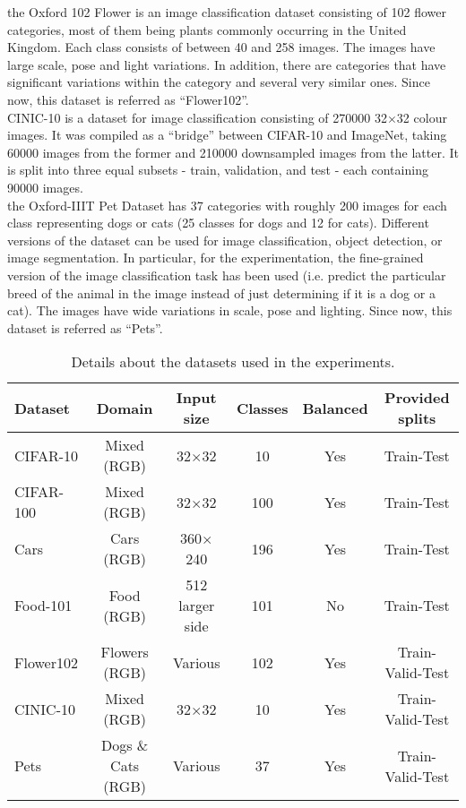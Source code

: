 \documentclass[review]{elsarticle}
\begin{document}
 the Oxford 102 Flower is an image classification dataset consisting of 102 flower categories, most of them being plants commonly occurring in the United Kingdom. Each class consists of between 40 and 258 images. The images have large scale, pose and light variations. In addition, there are categories that have significant variations within the category and several very similar ones. Since now, this dataset is referred as ``Flower102''.\\

CINIC-10 is a dataset for image classification consisting of 270000  32$\times$32 colour images. It was compiled as a ``bridge'' between CIFAR-10 and ImageNet, taking 60000 images from the former and 210000 downsampled images from the latter. It is split into three equal subsets - train, validation, and test - each containing 90000 images.\\

 the Oxford-IIIT Pet Dataset has 37 categories with roughly 200 images for each class representing dogs or cats (25 classes for dogs and 12 for cats). Different versions of the dataset can be used for image classification, object detection, or image segmentation. In particular, for the experimentation, the fine-grained version of the image classification task has been used (i.e. predict the particular breed of the animal in the image instead of just determining if it is a dog or a cat). The images have wide variations in scale, pose and lighting. Since now, this dataset is referred as ``Pets''.
\\
\begin{table*}[h]
\caption{Details about the datasets used in the  experiments.}
\newcommand\T{\rule{0pt}{2.5ex}}
\begin{center}
\begin{tabular}{lccccc}
{\bf Dataset} &  {\bf Domain} & {\bf Input size} & {\bf Classes}  & {\bf Balanced} & {\bf Provided splits}\\
    \hline
    \T
    CIFAR-10 & Mixed (RGB) & 32$\times$32 & 10 & Yes & Train-Test \\
    CIFAR-100 & Mixed (RGB) & 32$\times$32 & 100 & Yes & Train-Test \\
    Cars & Cars (RGB) & 360$\times$240 & 196 & Yes & Train-Test \\
    Food-101 & Food (RGB) & 512 larger side & 101 & No & Train-Test \\
    Flower102 & Flowers (RGB) & Various & 102 & Yes & Train-Valid-Test \\
    CINIC-10 & Mixed (RGB) & 32$\times$32 & 10 & Yes & Train-Valid-Test \\
    Pets & Dogs \& Cats (RGB) & Various & 37 & Yes & Train-Valid-Test 
\end{tabular}
\end{center}
\label{tab:datasetinfo}
\end{table*}
\end{document}
